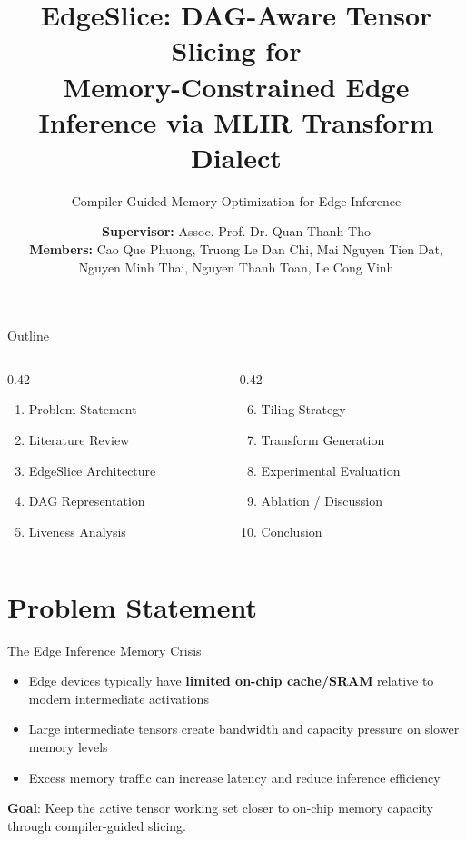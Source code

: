 \documentclass[10pt,aspectratio=169]{beamer}
\title{\textbf{EdgeSlice}: DAG-Aware Tensor Slicing for\\Memory-Constrained Edge Inference via MLIR Transform Dialect}
\subtitle{Compiler-Guided Memory Optimization for Edge Inference}
\author{
    \textbf{Supervisor:} Assoc. Prof. Dr. Quan Thanh Tho \\[0.2cm]
    \textbf{Members:} Cao Que Phuong, Truong Le Dan Chi, Mai Nguyen Tien Dat, \\
    Nguyen Minh Thai, Nguyen Thanh Toan, Le Cong Vinh
}
\institute{HCMUT}
\date{}
\begin{document}
\begin{frame}
\titlepage
\end{frame}

\begin{frame}{Outline}
\begin{columns}[T,totalwidth=0.88\textwidth]
\begin{column}{0.42\textwidth}
\begin{enumerate}
\item Problem Statement
\item Literature Review
\item EdgeSlice Architecture
\item DAG Representation
\item Liveness Analysis
\end{enumerate}
\end{column}
\begin{column}{0.42\textwidth}
\begin{enumerate}
\setcounter{enumi}{5}
\item Tiling Strategy
\item Transform Generation
\item Experimental Evaluation
\item Ablation / Discussion
\item Conclusion
\end{enumerate}
\end{column}
\end{columns}
\end{frame}

\section{Problem Statement}
\begin{frame}{The Edge Inference Memory Crisis}
\begin{itemize}
\item Edge devices typically have \textbf{limited on-chip cache/SRAM} relative to modern intermediate activations
\item Large intermediate tensors create bandwidth and capacity pressure on slower memory levels
\item Excess memory traffic can increase latency and reduce inference efficiency
\end{itemize}
\begin{center}
\textbf{Goal}: Keep the active tensor working set closer to on-chip memory capacity through compiler-guided slicing.
\end{center}
\end{frame}
\end{document}
